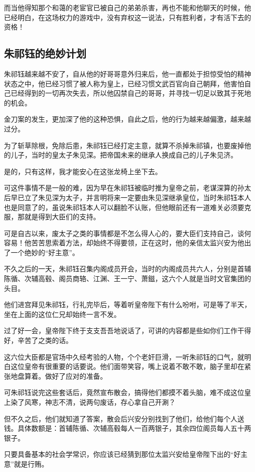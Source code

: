 \begin{multicols}{\theparacolNo}
而当他得知那个和蔼的老宦官已被自己的弟弟杀害，再也不能和他聊天的时候，他已经明白，在这场权力的游戏中，没有弃权这一说法，只有胜利者，才有活下去的资格！

\subsection{朱祁钰的绝妙计划}
朱祁钰越来越不安了，自从他的好哥哥意外归来后，他一直都处于担惊受怕的精神状态之中，他已经习惯了被人称为皇上，已经习惯文武百官向自己朝拜，他害怕自己已经得到的一切再次失去，所以他囚禁自己的哥哥，并寻找一切足以致其于死地的机会。

金刀案的发生，更加深了他的这种恐惧，自此之后，他的行为越来越偏激，越来越过分。

为了斩草除根，免除后患，朱祁钰已经打定主意，就算不杀掉朱祁镇，也要废掉他的儿子，当时的皇太子朱见深。把帝国未来的继承人换成自己的儿子朱见济。

是的，只有这样，我才能安心在这张龙椅上坐下去。

可这件事情不是一般的难，因为早在朱祁钰被临时推为皇帝之前，老谋深算的孙太后早已立了朱见深为太子，并言明将来一定要由朱见深继承皇位，当时朱祁钰本人也是同意了的，虽说朱祁钰本人可以翻脸不认账，但他眼前还有一道难关必须要克服，那就是得到大臣们的支持。

可是自古以来，废太子之类的事情都是不怎么得人心的，要大臣们支持自己，谈何容易！他苦苦思索着方法，却始终不得要领，正在这时，他的亲信太监兴安为他出了一个绝妙的“好主意”。

不久之后的一天，朱祁钰召集内阁成员开会，当时的内阁成员共六人，分别是首辅陈循、次辅高毂、阁员商辂、江渊、王一宁、萧鎡，这六个人就是当时文官集团的头目。

他们进宫拜见朱祁钰，行礼完毕后，等着听皇帝陛下有什么吩咐，可是等了半天，坐在上面的这位仁兄却始终一言不发。

过了好一会，皇帝陛下终于支支吾吾地说话了，可讲的内容都是些如你们工作干得好，辛苦了之类的话。

这六位大臣都是官场中久经考验的人物，个个老奸巨滑，一听朱祁钰的口气，就明白这位皇帝有很重要的话要说。他们面带笑容，嘴上说着不敢不敢，脑子里却在紧张地盘算着。做好了应对的准备。

可朱祁钰说完这些套话后，竟然宣布散会，搞得他们都摸不着头脑，难不成这位皇上染了风寒，神志不清，说两句废话，存心拿自己开涮？

但不久之后，他们就知道了答案，散会后兴安分别找到了他们，给他们每个人送钱。具体数额是：首辅陈循、次辅高毂每人一百两银子，其余四位阁员每人五十两银子。

只要具备基本的社会学常识，你应该已经猜到那位太监兴安给皇帝陛下出的“好主意”就是行贿。


\end{multicols}
